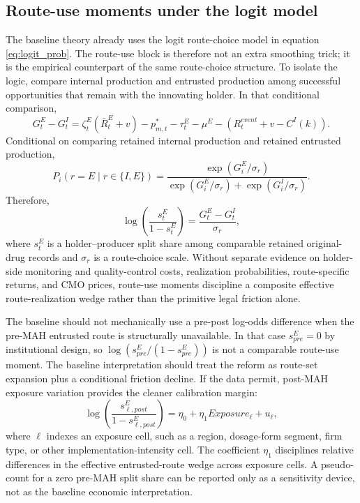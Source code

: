 \documentclass[12pt]{article}
\newcommand{\1}{\mathbf{1}}
\begin{document}
\subsection{Route-use moments under the logit model}

The baseline theory already uses the logit route-choice model in equation \eqref{eq:logit_prob}. The route-use block is therefore not an extra smoothing trick; it is the empirical counterpart of the same route-choice structure. To isolate the logic, compare internal production and entrusted production among successful opportunities that remain with the innovating holder. In that conditional comparison,
\begin{equation}
    G_t^E-G_t^I
    =
    \zeta_t^E(\bar R_t^E+v)
    -p_{m,t}^*
    -\tau_t^E-\mu^E
    -
    (R_t^{event}+v-C^I(k)).
    \label{eq:route_gap}
\end{equation}
Conditional on comparing retained internal production and retained entrusted production,
\begin{equation}
    P_i(r=E\mid r\in\{I,E\})
    =
    \frac{\exp(G_i^E/\sigma_r)}
    {\exp(G_i^E/\sigma_r)+\exp(G_i^I/\sigma_r)}.
    \label{eq:calib_logit_probability}
\end{equation}
Therefore,
\begin{equation}
    \log\left(\frac{s_t^E}{1-s_t^E}\right)
    =
    \frac{G_t^E-G_t^I}{\sigma_r},
    \label{eq:logodds}
\end{equation}
where $s_t^E$ is a holder--producer split share among comparable retained original-drug records and $\sigma_r$ is a route-choice scale. Without separate evidence on holder-side monitoring and quality-control costs, realization probabilities, route-specific returns, and CMO prices, route-use moments discipline a composite effective route-realization wedge rather than the primitive legal friction alone.

The baseline should not mechanically use a pre-post log-odds difference when the pre-MAH entrusted route is structurally unavailable. In that case $s_{pre}^E=0$ by institutional design, so $\log(s_{pre}^E/(1-s_{pre}^E))$ is not a comparable route-use moment. The baseline interpretation should treat the reform as route-set expansion plus a conditional friction decline. If the data permit, post-MAH exposure variation provides the cleaner calibration margin:
\begin{equation}
    \log\left(\frac{s_{\ell,post}^E}{1-s_{\ell,post}^E}\right)
    =
    \eta_0+\eta_1 Exposure_\ell+u_\ell,
    \label{eq:post_exposure_logodds}
\end{equation}
where $\ell$ indexes an exposure cell, such as a region, dosage-form segment, firm type, or other implementation-intensity cell. The coefficient $\eta_1$ disciplines relative differences in the effective entrusted-route wedge across exposure cells. A pseudo-count for a zero pre-MAH split share can be reported only as a sensitivity device, not as the baseline economic interpretation.
\end{document}
